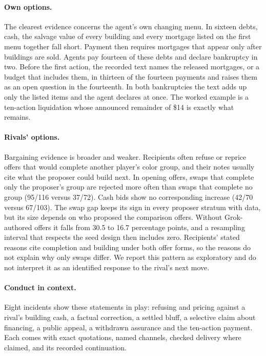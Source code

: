 \paragraph{Own options.} The clearest evidence concerns the agent's own changing menu. In sixteen debts, cash, the salvage value of every building and every mortgage listed on the first menu together fall short. Payment then requires mortgages that appear only after buildings are sold. Agents pay fourteen of these debts and declare bankruptcy in two. Before the first action, the recorded text names the released mortgages, or a budget that includes them, in thirteen of the fourteen payments and raises them as an open question in the fourteenth. In both bankruptcies the text adds up only the listed items and the agent declares at once. The worked example is a ten-action liquidation whose announced remainder of \$14 is exactly what remains.

\paragraph{Rivals' options.} Bargaining evidence is broader and weaker. Recipients often refuse or reprice offers that would complete another player's color group, and their notes usually cite what the proposer could build next. In opening offers, swaps that complete only the proposer's group are rejected more often than swaps that complete no group (95/116 versus 37/72). Cash bids show no corresponding increase (42/70 versus 67/103). The swap gap keeps its sign in every proposer stratum with data, but its size depends on who proposed the comparison offers. Without Grok-authored offers it falls from 30.5 to 16.7 percentage points, and a resampling interval that respects the seed design then includes zero. Recipients' stated reasons cite completion and building under both offer forms, so the reasons do not explain why only swaps differ. We report this pattern as exploratory and do not interpret it as an identified response to the rival's next move.

\paragraph{Conduct in context.} Eight incidents show these statements in play: refusing and pricing against a rival's building cash, a factual correction, a settled bluff, a selective claim about financing, a public appeal, a withdrawn assurance and the ten-action payment. Each comes with exact quotations, named channels, checked delivery where claimed, and its recorded continuation.

